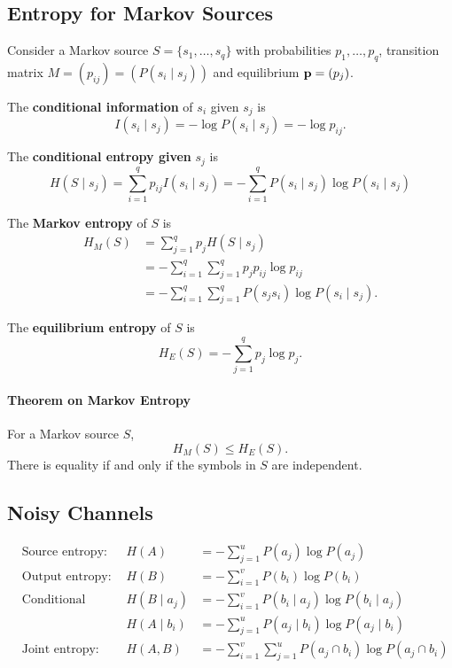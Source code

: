 \subsection{Entropy for Markov Sources}
Consider a Markov source \(S = \{s_1, \dots, s_q \}\) with probabilities \(p_1, \dots, p_q\), transition matrix \(M = (p_{ij}) = (P(s_i \mid s_j))\) and equilibrium \({\bf p} = (p_j)\).

The \textbf{conditional information} of \(s_i\) given \(s_j\) is
\[I(s_i \mid s_j) = -\log P(s_i \mid s_j) = -\log p_{ij}.\]

The \textbf{conditional entropy given} \(s_j\) is
\[H(S \mid s_j) = \sum_{i=1}^{q}p_{ij} I(s_i \mid s_j) = - \sum_{i=1}^{q} P(s_i \mid s_j) \log P(s_i \mid s_j)\]

The \textbf{Markov entropy} of \(S\) is
\begin{align*}
    H_M (S) & = \sum_{j=1}^{q} p_j H(S \mid s_j)                              \\
            & = - \sum_{i=1}^{q}\sum_{j=1}^{q}p_j p_{ij} \log p_{ij}          \\
            & = -\sum_{i=1}^{q}\sum_{j=1}^{q}P(s_j s_i) \log P(s_i \mid s_j).
\end{align*}

The \textbf{equilibrium entropy} of \(S\) is
\[H_E(S) = -\sum_{j=1}^{q}p_j \log p_j.\]

\paragraph{Theorem on Markov Entropy}
For a Markov source \(S\),
\[H_M (S) \leq H_E(S).\]
There is equality if and only if the symbols in \(S\) are independent.

\subsection{Noisy Channels}
\[
    \begin{alignat*}{4}
         & \text{Source entropy: }        & H(A)          & = -\sum_{j = 1}^{u}P(a_j)\log P(a_j)                                  \\
         & \text{Output entropy: }        & H(B)          & = -\sum_{i=1}^{v} P(b_i) \log P(b_i)                                  \\
         & \text{Conditional entropies: } & H(B \mid a_j) & = -\sum_{i=1}^{v} P(b_i \mid a_j) \log P(b_i \mid a_j)                \\
         &                                & H(A \mid b_i) & = -\sum_{j=1}^{u} P(a_j \mid b_i) \log P(a_j \mid b_i)                \\
         & \text{Joint entropy: }         & H(A, B)       & = -\sum_{i=1}^{v} \sum_{j=1}^{u} P(a_j \cap b_i) \log P(a_j \cap b_i)
    \end{alignat*}
\]

